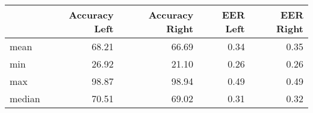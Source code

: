 \begin{tabular}{lrrrr}
\toprule
{} &  Accuracy Left &  Accuracy Right &  EER Left &  EER Right \\
\midrule
mean   &          68.21 &           66.69 &      0.34 &       0.35 \\
min    &          26.92 &           21.10 &      0.26 &       0.26 \\
max    &          98.87 &           98.94 &      0.49 &       0.49 \\
median &          70.51 &           69.02 &      0.31 &       0.32 \\
\bottomrule
\end{tabular}
